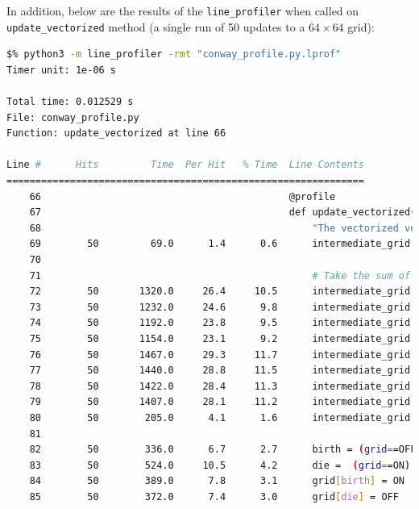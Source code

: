 \documentclass[a4paper,12pt]{article}
\begin{document}
In addition, below are the results of the \verb|line_profiler| when called on \verb|update_vectorized| method (a single run of 50 updates to a $64 \times 64$ grid): 

\begin{lstlisting}[language=bash,basicstyle=\tiny\ttfamily]
$% python3 -m line_profiler -rmt "conway_profile.py.lprof"
Timer unit: 1e-06 s

Total time: 0.012529 s
File: conway_profile.py
Function: update_vectorized at line 66

Line #      Hits         Time  Per Hit   % Time  Line Contents
==============================================================
    66                                           @profile                                                                   
    67                                           def update_vectorized(grid, n):                                            
    68                                               "The vectorized version of the grid update in conway's game of life"   
    69        50         69.0      1.4      0.6      intermediate_grid = np.zeros(grid.shape)                               
    70                                                                                                                      
    71                                               # Take the sum of the 8 neighbours, using in place operations          
    72        50       1320.0     26.4     10.5      intermediate_grid += np.roll(grid, (0, 1), (0, 1))                     
    73        50       1232.0     24.6      9.8      intermediate_grid += np.roll(grid, (0, -1), (0, 1))                    
    74        50       1192.0     23.8      9.5      intermediate_grid += np.roll(grid, (1, 0), (0, 1))                     
    75        50       1154.0     23.1      9.2      intermediate_grid += np.roll(grid, (-1, 0), (0, 1))                    
    76        50       1467.0     29.3     11.7      intermediate_grid += np.roll(grid, (1, 1), (0, 1))                     
    77        50       1440.0     28.8     11.5      intermediate_grid += np.roll(grid, (1, -1), (0, 1))                    
    78        50       1422.0     28.4     11.3      intermediate_grid += np.roll(grid, (-1, 1), (0, 1))                    
    79        50       1407.0     28.1     11.2      intermediate_grid += np.roll(grid, (-1, -1), (0, 1))                   
    80        50        205.0      4.1      1.6      intermediate_grid /= 255                                               
    81                                                                                                                      
    82        50        336.0      6.7      2.7      birth = (grid==OFF) & (intermediate_grid==3)                           
    83        50        524.0     10.5      4.2      die =  (grid==ON) & ((intermediate_grid < 2) | (intermediate_grid > 3))
    84        50        389.0      7.8      3.1      grid[birth] = ON                                                       
    85        50        372.0      7.4      3.0      grid[die] = OFF                                                        



\end{lstlisting}
\end{document}
